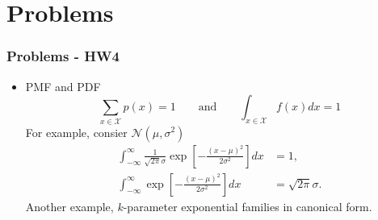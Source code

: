 \documentclass[serif,mathserif,professionalfont]{beamer}
\begin{document}
%	
%	
%	






\section{Problems}



\begin{frame}
	
	\frametitle{Problems - HW4}
	
	\begin{itemize}
		\item PMF and PDF
		\begin{equation*}
		\sum_{x \in \mathcal{X}} p(x) = 1 \qquad \text{and} \qquad \int_{x \in \mathcal{X}} f(x) dx = 1
		\end{equation*}
		For example, consier $ \mathcal{N}\left(\mu, \sigma^2 \right) $
		\begin{equation*}
		\begin{split}
		\int_{-\infty}^{\infty} \frac{1}{\sqrt{2 \pi} \sigma} \exp \left[-\frac{\left(x - \mu \right)^2}{2 \sigma^2} \right] dx & = 1, \\
		\int_{-\infty}^{\infty} \exp \left[-\frac{\left(x - \mu \right)^2}{2 \sigma^2} \right] dx & = \sqrt{2 \pi} \sigma.
		\end{split}
		\end{equation*}
		Another example, $ k $-parameter exponential families in canonical form.
	\end{itemize}
	
	
\end{frame}
\end{document}

